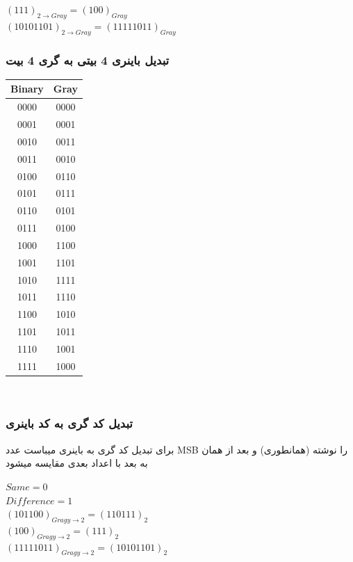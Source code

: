 \documentclass[pt, a5paper]{article}
\begin{document}
$(111)_{2\rightarrow Gray} = (100)_{Gray}$ \\

$(10101101)_{2\rightarrow Gray} = (11111011)_{Gray}$ \\

 \raggedleft
 \subsubsection{تبدیل باینری 4 بیتی به گری 4 بیت}
\center
\begin{LTR}
	\begin{tabular}{ c | c }
		Binary & Gray\\
		\hline
		0000 & 0000\\
		0001 & 0001\\
		0010 & 0011\\
		0011 & 0010\\
		0100 & 0110\\
		0101 & 0111\\
		0110 & 0101\\
		0111 & 0100\\
		1000 & 1100\\
		1001 & 1101\\
		1010 & 1111\\
		1011 & 1110\\
		1100 & 1010\\
		1101 & 1011\\
		1110 & 1001\\
		1111 & 1000\\	
	\end{tabular}\\
\end{LTR}
\raggedleft

 \subsubsection{تبدیل کد گری به کد باینری}
برای تبدیل کد گری به باینری میباست عدد MSB را نوشته (همانطوری) و بعد از همان به بعد با اعداد بعدی مقایسه میشود\\

\raggedright
$Same = 0$\\
$Difference = 1$\\
$(101100)_{Gragy\rightarrow 2} = (110111)_{2}$\\

$(100)_{Gragy\rightarrow 2} = (111)_{2}$ \\

$(11111011)_{Gragy\rightarrow 2} = (10101101)_{2}$ \\
\end{document}
